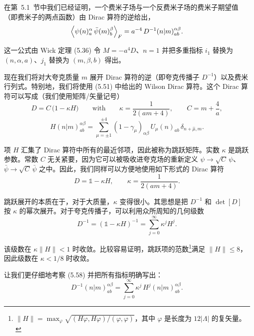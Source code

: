 在第~5.1~节中我们已经证明，一个费米子场与一个反费米子场的费米子期望值（即费米子的两点函数）由 Dirac 算符的逆给出，
\begin{equation}
  \left\langle \psi(n)^{\alpha}_a\,\bar{\psi}(m)^{\beta}_b \right\rangle_F
  = a^{-4}\,D^{-1}(n|m)^{\alpha\beta}_{ab} .
\end{equation}

这一公式由 Wick 定理 (5.36) 令 $M = -a^4 D$、$n = 1$ 并把多重指标 $i_1$ 替换为 $(n, \alpha, a)$、$j_1$ 替换为 $(m, \beta, b)$ 得出。

现在我们将对大夸克质量 $m$ 展开 Dirac 算符的逆（即夸克传播子 $D^{-1}$）以及费米行列式。特别地，我们将使用 (5.51) 中给出的 Wilson Dirac 算符。这个 Dirac 算符可以写成（我们使用矩阵/矢量记号）
\begin{equation}
  D = C\,\big(1 - \kappa H\big)
  \qquad \text{with} \qquad
  \kappa = \frac{1}{2(am+4)}, \qquad C = m + \frac{4}{a},
\end{equation}
\begin{equation}
  H(n|m)^{\alpha\beta}_{ab} = \sum_{\mu=\pm1}^{\pm4}(1-\gamma_\mu)_{\alpha\beta}\,
    U_\mu(n)_{ab}\,\delta_{n+\hat{\mu},m} .
\end{equation}

项 $H$ 汇集了 Dirac 算符中所有的最近邻项，因此被称为跳跃矩阵。实数 $\kappa$ 是跳跃参数。常数 $C$ 无关紧要，因为它可以被吸收进夸克场的重新定义 $\psi \to \sqrt{C}\,\psi$、$\bar{\psi} \to \sqrt{C}\,\bar{\psi}$ 之中。因此，我们同样可以方便地使用如下形式的 Dirac 算符
\begin{equation}
  D = \mathbb{1} - \kappa H, \qquad \kappa = \frac{1}{2(am+4)} .
\end{equation}

跳跃展开的本质在于，对于大质量，$\kappa$ 变得很小。其思想是把 $D^{-1}$ 和 $\det[D]$ 按 $\kappa$ 的幂次展开。对于夸克传播子，可以利用众所周知的几何级数
\begin{equation}
  D^{-1} = (\mathbb{1} - \kappa H)^{-1} = \sum_{j=0}^{\infty}\kappa^j H^j .
\end{equation}

该级数在 $\kappa\|H\| < 1$ 时收敛。比较容易证明，跳跃项的范数\footnote{$\|H\| = \max_\varphi \sqrt{(H\varphi, H\varphi)/(\varphi, \varphi)}$，其中 $\varphi$ 是长度为 $12|\Lambda|$ 的复矢量。}满足 $\|H\| \leq 8$，因此级数在 $\kappa < 1/8$ 时收敛。

让我们更仔细地考察 (5.58) 并把所有指标明确写出：
\begin{equation}
  D^{-1}(n|m)^{\alpha\beta}_{ab} = \sum_{j=0}^{\infty}\kappa^j\,H^j(n|m)^{\alpha\beta}_{ab} .
\end{equation}

